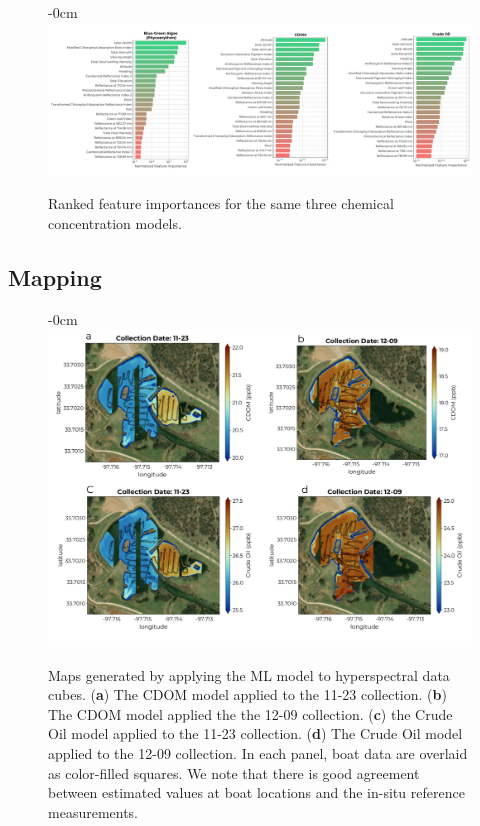 \documentclass[journal,article,submit,pdftex,moreauthors]{Definitions/mdpi}
\begin{document}
\begin{figure}[H]
\begin{adjustwidth}{-\extralength}{0cm}
\centering
\includegraphics[width=18.0cm]{paper/figures/results/fits/chemical-ranking.pdf}
\end{adjustwidth}
\caption{Ranked feature importances for the same three chemical concentration models.\label{fig:chemicals-fit}}
\end{figure}  



\subsection{Mapping}

\begin{figure}[H]
\begin{adjustwidth}{-\extralength}{0cm}
\centering
\includegraphics[width=18.0cm]{paper/figures/results/map-combined.pdf}
\end{adjustwidth}
\caption{Maps generated by applying the ML model to hyperspectral data cubes. (\textbf{a}) The CDOM model applied to the 11-23 collection. (\textbf{b}) The CDOM model applied the the 12-09 collection. (\textbf{c}) the Crude Oil model applied to the 11-23 collection. (\textbf{d}) The Crude Oil model applied to the 12-09 collection. In each panel, boat data are overlaid as color-filled squares. We note that there is good agreement between estimated values at boat locations and the in-situ reference measurements. \label{fig:maps}}
\end{figure}  
\end{document}
